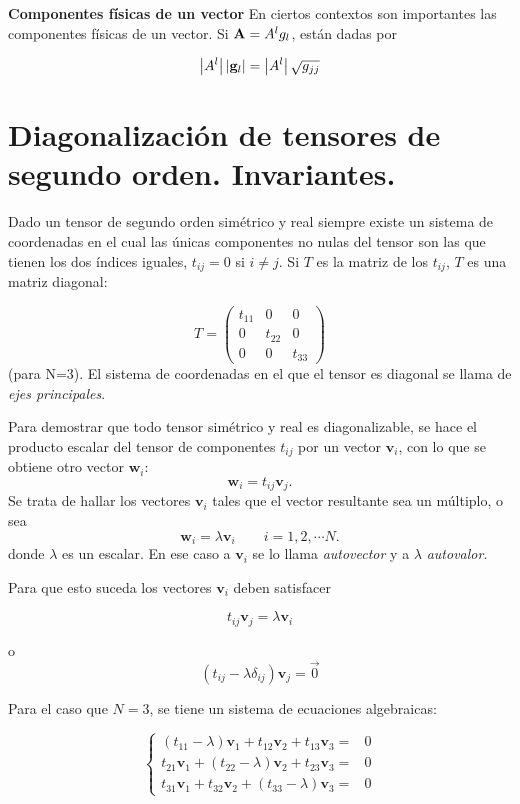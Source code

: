 \textbf{Componentes físicas de un vector}
En ciertos contextos son importantes las componentes físicas de un vector. Si $ \bold A= A^l  g_l $, están dadas por 

$$  \left |A^l \right |   \left |\bold{g}_l \right |  = \left |A^l \right | \sqrt{g_{jj}}$$





\section{Diagonalización de tensores de segundo orden. Invariantes.}

Dado un tensor de segundo orden simétrico y real siempre existe un sistema de coordenadas en el cual las únicas componentes no nulas del tensor son las que tienen los dos índices iguales, $t_{ij}=0$  si $i \neq j$. 
Si $T$ es la matriz de los $t_{ij}$, $T$ es una matriz diagonal:

$$T= \left(\begin{array}{ccc}  t_{11}& 0 & 0 \\ 0 &  t_{22} & 0 \\   0 & 0 & t_{33}
\end{array}
 \right)$$
\noindent
(para N=3).
El sistema de coordenadas en el que el tensor es diagonal se llama de \textit{ejes principales}.

Para demostrar que todo tensor simétrico y real es diagonalizable, se hace el producto escalar del tensor de componentes $t_{ij}$ por un vector $\textbf{v}_i$, con lo que se obtiene otro vector   $\textbf{w}_i$:
$$\textbf{w}_i= t_{ij}\textbf{v}_j.$$
Se trata de hallar los vectores $\textbf{v}_i$ tales que el vector resultante sea un múltiplo, o sea 
$$\textbf{w}_i= \lambda  \textbf{v}_i   \qquad   i=1,2, \cdots N.$$
donde   $ \lambda$ es un escalar. En ese caso a $\textbf{v}_i$ se lo llama \textit{autovector} y a  $ \lambda$  \textit{autovalor}.

Para que esto suceda los vectores $\textbf{v}_i$ deben satisfacer 

$$t_{ij}\textbf{v}_j= \lambda  \textbf{v}_i  $$


o
$$(t_{ij}- \lambda \delta_{ij})\textbf{v}_j= \vec{0}  $$





Para el caso que $N=3$, se tiene  un sistema de  ecuaciones  algebraicas:


\begin{equation} \label{diagT}
\left\{ \begin{array} {ccl} 
                    (t_{11}-\lambda)\textbf{v}_1+t_{12}\textbf{v}_2 +t_{13}\textbf{v}_3  =& 0  \\
                    t_{21}\textbf{v}_1+(t_{22}-\lambda)\textbf{v}_2+t_{23}\textbf{v}_3 =& 0 \\
                    t_{31}\textbf{v}_1+t_{32}\textbf{v}_2+(t_{33}-\lambda)\textbf{v}_3  =& 0
                   \end{array}
           \right.
\end{equation}



